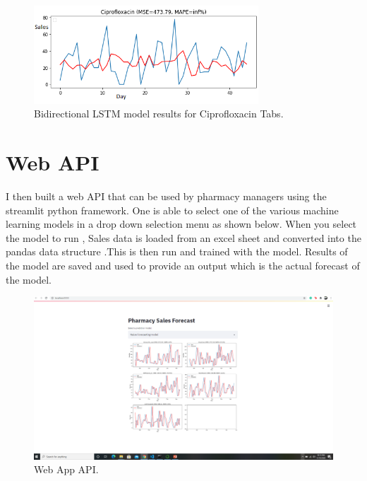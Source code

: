 \documentclass[12pt]{report}
\begin{document}
\begin{figure}[H]%
  \begin {center}
  \includegraphics[width=0.75\textwidth]{images/bi (6)B.png}
  \caption{Bidirectional LSTM model results for Ciprofloxacin Tabs.}
  \label{fig:ecg}
  \end {center}
\end{figure}


\section{Web API}
I then built a web API that can be used by pharmacy managers using the streamlit python framework. One is able to select one of the various machine learning models in a drop down selection menu as shown below.
When you select the model to run , Sales data is loaded from an excel sheet and converted into the pandas data structure .This is then run and trained with the model. Results of the model are saved and used to provide an output which is the actual forecast of the model. 


\begin{figure}[H]%
  \begin {center}
  \includegraphics[width=1\textwidth]{images/WebApp.PNG}
  \caption{Web App API.}
  \label{fig:ecg}
  \end {center}
  \end{figure}
\end{document}
